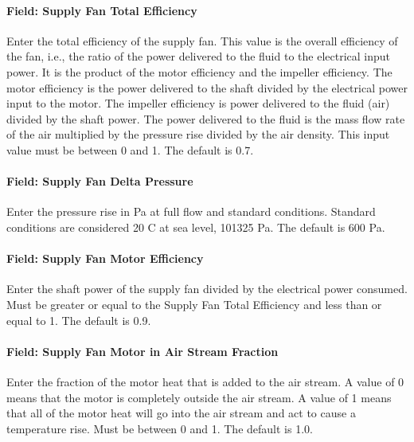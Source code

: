 \paragraph{Field: Supply Fan Total Efficiency}\label{field-supply-fan-total-efficiency-7}

Enter the total efficiency of the supply fan. This value is the overall efficiency of the fan, i.e., the ratio of the power delivered to the fluid to the electrical input power. It is the product of the motor efficiency and the impeller efficiency. The motor efficiency is the power delivered to the shaft divided by the electrical power input to the motor. The impeller efficiency is power delivered to the fluid (air) divided by the shaft power. The power delivered to the fluid is the mass flow rate of the air multiplied by the pressure rise divided by the air density. This input value must be between 0 and 1. The default is 0.7.

\paragraph{Field: Supply Fan Delta Pressure}\label{field-supply-fan-delta-pressure-6}

Enter the pressure rise in Pa at full flow and standard conditions. Standard conditions are considered 20 C at sea level, 101325 Pa. The default is 600 Pa.

\paragraph{Field: Supply Fan Motor Efficiency}\label{field-supply-fan-motor-efficiency-7}

Enter the shaft power of the supply fan divided by the electrical power consumed. Must be greater or equal to the Supply Fan Total Efficiency and less than or equal to 1. The default is 0.9.

\paragraph{Field: Supply Fan Motor in Air Stream Fraction}\label{field-supply-fan-motor-in-air-stream-fraction-3}

Enter the fraction of the motor heat that is added to the air stream. A value of 0 means that the motor is completely outside the air stream. A value of 1 means that all of the motor heat will go into the air stream and act to cause a temperature rise. Must be between 0 and 1. The default is 1.0.

